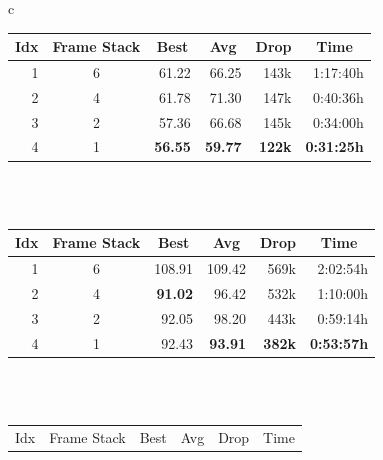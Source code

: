 \begin{table}[htp]
    \begin{center}
        \begin{tabular}{c}
            \begin{tabular}{rcrrrr}
                \toprule
                \multicolumn{1}{c}{Idx} & \multicolumn{1}{c}{Frame Stack} & \multicolumn{1}{c}{Best} & \multicolumn{1}{c}{Avg} & \multicolumn{1}{c}{Drop} & \multicolumn{1}{c}{Time}\\
                \midrule
                1 & 6 & 61.22 & 66.25 & 143k & 1:17:40h \\
                2 & 4 & 61.78 & 71.30 & 147k & 0:40:36h \\
                3 & 2 & 57.36 & 66.68 & 145k & 0:34:00h \\
                4 & 1 & \textbf{56.55} & \textbf{59.77} & \textbf{122k} & \textbf{0:31:25h} \\
                \bottomrule
            \end{tabular} \\
             \\
            \addlinespace[0.5cm]
            \begin{tabular}{rcrrrr}
                \toprule
                \multicolumn{1}{c}{Idx} & \multicolumn{1}{c}{Frame Stack} & \multicolumn{1}{c}{Best} & \multicolumn{1}{c}{Avg} & \multicolumn{1}{c}{Drop} & \multicolumn{1}{c}{Time}\\
                \midrule
                1 & 6 & 108.91 & 109.42 & 569k & 2:02:54h \\
                2 & 4 & \textbf{91.02} & 96.42 & 532k & 1:10:00h \\
                3 & 2 & 92.05 & 98.20 & 443k & 0:59:14h \\
                4 & 1 & 92.43 & \textbf{93.91} & \textbf{382k} & \textbf{0:53:57h} \\
                \bottomrule
            \end{tabular} \\
             \\
            \addlinespace[0.5cm]
            \begin{tabular}{rcrrrr}
                \toprule
                \multicolumn{1}{c}{Idx} & \multicolumn{1}{c}{Frame Stack} & \multicolumn{1}{c}{Best} & \multicolumn{1}{c}{Avg} & \multicolumn{1}{c}{Drop} & \multicolumn{1}{c}{Time}\\

\end{tabular}
\end{tabular}
\end{center}
\end{table}
